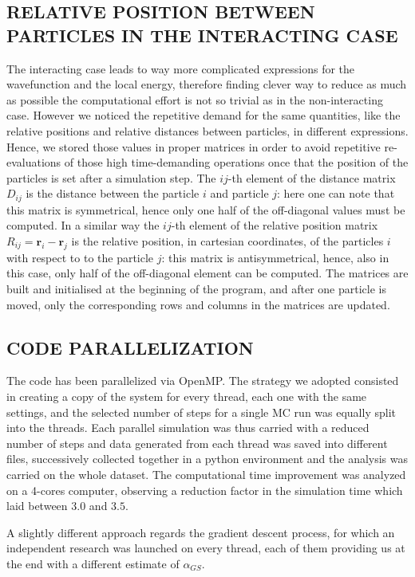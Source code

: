 \subsection{RELATIVE POSITION BETWEEN PARTICLES IN THE INTERACTING CASE}
\label{sec:matrix_relative_dist}
The interacting case leads to way more complicated expressions for the wavefunction and the local energy, therefore finding clever way to reduce as much as possible the computational effort is not so trivial as in the non-interacting case. However we noticed the repetitive demand for the same quantities, like the relative positions and relative distances between particles, in different expressions. Hence, we stored those values in proper matrices in order to avoid repetitive re-evaluations of those high time-demanding operations once that the position of the particles is set after a simulation step. The $ij$-th element of the distance matrix $D_{ij}$ is the distance between the particle $i$ and particle $j$: here one can note that this matrix is symmetrical, hence only one half of the off-diagonal values must be computed. In a similar way the $ij$-th element of the relative position matrix $R_{ij} = \bm{r}_i - \bm{r}_j$ is the relative position, in cartesian coordinates, of the particles $i$ with respect to to the particle $j$: this matrix is antisymmetrical, hence, also in this case, only half of the off-diagonal element can be computed. The matrices are built and initialised at the beginning of the program, and after one particle is moved, only the corresponding rows and columns in the matrices are updated.



    
\subsection{CODE PARALLELIZATION}
The code has been parallelized via OpenMP. The strategy we adopted consisted in creating a copy of the system for every thread, each one with the same settings, and the selected number of steps for a single MC run was  equally split into the threads. Each parallel simulation was thus carried with a reduced number of steps and data generated from each thread was saved into different files, successively collected together in a python environment and the analysis was carried on the whole dataset. The  computational time improvement was analyzed on a 4-cores computer, observing a reduction factor in the simulation time which laid between $3.0$ and $3.5$.

A slightly different approach regards the gradient descent process, for which an independent research was launched on every thread, each of them providing us at the end with a different estimate of $\alpha_{GS}$. 

